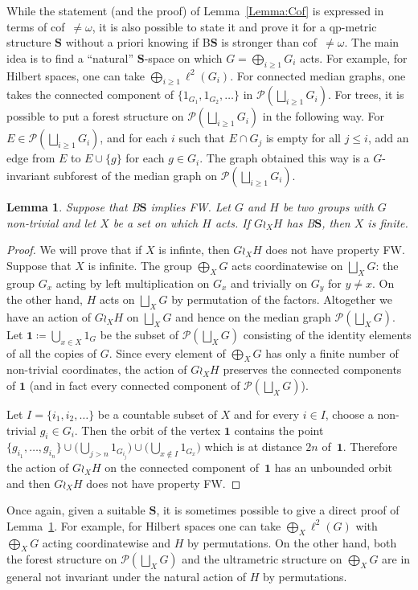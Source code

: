\documentclass[a4paper]{article}
\newtheorem{lem}{Lemma}[section]
\theoremstyle{definition}
\newcommand*{\BS}{B$\mathbf{S}$}
\newcommand*{\powerset}[1]{\mathcal P(#1)}
\begin{document}
%
%
While the statement (and the proof) of Lemma~\ref{Lemma:Cof} is expressed in terms of cof~$\neq\omega$, it is also possible to state it and prove it for a qp-metric structure $\mathbf{S}$ without a priori knowing if \BS{} is stronger than cof~$\neq\omega$.
The main idea is to find a ``natural'' $\mathbf S$-space on which $G=\bigoplus_{i\geq 1}G_i$ acts. For example, for Hilbert spaces, one can take $\bigoplus_{i\geq 1}\ell^2(G_i)$. For connected median graphs, one takes the connected component of $\{1_{G_1},1_{G_2},\dots\}$ in $\powerset{\bigsqcup_{i\geq 1} G_i}$.
For trees, it is possible to put a forest structure on $\powerset{\bigsqcup_{i\geq 1} G_i}$ in the following way.
For $E\in\powerset{\bigsqcup_{i\geq 1} G_i}$, and for each $i$ such that $E\cap G_j$ is empty for all $j\leq i$, add an edge from $E$ to $E\cup\{g\}$ for each $g\in G_i$. The graph obtained this way is a $G$-invariant subforest of the median graph on $\powerset{\bigsqcup_{i\geq 1} G_i}$.
%
%
\begin{lem}\label{Lemma:XFinite}
Suppose that \BS{} implies FW.
Let $G$ and $H$ be two groups with $G$ non-trivial and let $X$ be a set on which $H$ acts.
If $G\wr_XH$ has \BS, then $X$ is finite.
\end{lem}
\begin{proof}
We will prove that if $X$ is infinte, then $G\wr_XH$ does not have property FW. Suppose that $X$ is infinite.
The group $\bigoplus_XG$ acts coordinatewise on  $\bigsqcup_XG$: the group $G_x$ acting by left multiplication on $G_x$ and trivially on $G_y$ for $y\neq x$. On the other hand, $H$ acts on $\bigsqcup_XG$ by permutation of the factors.
Altogether we have an action of $G\wr_XH$ on $\bigsqcup_XG$ and hence on the median graph $\powerset{\bigsqcup_XG}$.
Let $\mathbf 1\coloneqq\bigcup_{x\in X} 1_{G}$ be the subset of $\powerset{\bigsqcup_XG}$ consisting of the identity elements of all the copies of $G$.
Since every element of $\bigoplus_XG$ has only a finite number of non-trivial coordinates, the action of $G\wr_XH$ preserves the connected components of $\mathbf 1$ (and in fact every connected component of $\powerset{\bigsqcup_XG}$).

Let $I=\{i_1,i_2,\dots\}$ be a countable subset of $X$ and for every $i\in I$, choose a non-trivial $g_i\in G_{i}$.
Then the orbit of the vertex $\mathbf 1$ contains the point $\{g_{i_1},\dots, g_{i_n}\}\cup\bigl(\bigcup_{j>n} 1_{G_{i_j}}\bigr)\cup\bigl(\bigcup_{x\notin I} 1_{G_{x}}\bigr)$ which is at distance $2n$ of~$\mathbf 1$.
Therefore the action of $G\wr_XH$ on the connected component of~$\mathbf 1$ has an unbounded orbit and then $G\wr_XH$ does not have property FW.
\end{proof}
%
%
Once again, given a suitable $\mathbf{S}$, it is sometimes possible to give a direct proof of Lemma~\ref{Lemma:XFinite}.
For example, for Hilbert spaces one can take $\bigoplus_X\ell^2(G)$ with $\bigoplus_XG$ acting coordinatewise and $H$ by permutations.
On the other hand, both the forest structure on $\powerset{\bigsqcup_XG}$ and the ultrametric structure on $\bigoplus_XG$ are in general not invariant under the natural action of $H$ by permutations.
\end{document}
